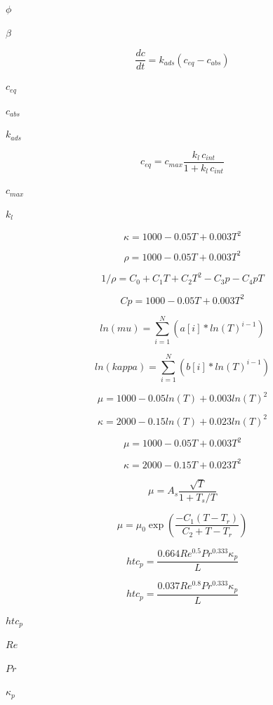 \documentclass{article}
\begin{document}
$\phi$
\pagebreak

$\beta$
\pagebreak

\[
    \frac{d c}{d t} = k_{ads} (c_{eq} - c_{abs})
\]
\pagebreak

$      c_{eq}       $
\pagebreak

$      c_{abs}      $
\pagebreak

$      k_{ads}      $
\pagebreak

\[
        c_{eq} = c_{max} \frac{k_l \, c_{int}}{1 + k_l \, c_{int}}
    \]
\pagebreak

$      c_{max}      $
\pagebreak

$      k_l          $
\pagebreak

\[
            \kappa = 1000 - 0.05 T + 0.003 T^2
        \]
\pagebreak

\[
            \rho = 1000 - 0.05 T + 0.003 T^2
        \]
\pagebreak

\[
    1/\rho = C_0 + C_1 T + C_2 T^2 - C_3 p - C_4 p T
\]
\pagebreak

\[
            Cp = 1000 - 0.05 T + 0.003 T^2
        \]
\pagebreak

\[
        ln(mu)    = \sum_{i=1}^N \left( a[i] * ln(T)^{i-1} \right)
    \]
\pagebreak

\[
        ln(kappa) = \sum_{i=1}^N \left( b[i] * ln(T)^{i-1} \right)
    \]
\pagebreak

\[
            \mu    = 1000 - 0.05 ln(T) + 0.003 ln(T)^2
        \]
\pagebreak

\[
            \kappa = 2000 - 0.15 ln(T) + 0.023 ln(T)^2
        \]
\pagebreak

\[
            \mu    = 1000 - 0.05 T + 0.003 T^2
        \]
\pagebreak

\[
            \kappa = 2000 - 0.15 T + 0.023 T^2
        \]
\pagebreak

\[
    \mu = A_s \frac{\sqrt{T}}{1 + T_s / T}
\]
\pagebreak

\[
    \mu = \mu_0 \exp \left(\frac{-C_1 ( T - T_r )}{C_2 + T - T_r}\right)
\]
\pagebreak

\[
    htc_p = \frac{0.664 Re^{0.5} Pr^{0.333} \kappa_p}{L}
\]
\pagebreak

\[
    htc_p = \frac{0.037 Re^{0.8} Pr^{0.333} \kappa_p}{L}
\]
\pagebreak

$        htc_p   $
\pagebreak

$        Re      $
\pagebreak

$        Pr      $
\pagebreak

$        \kappa_p $
\pagebreak
\end{document}

